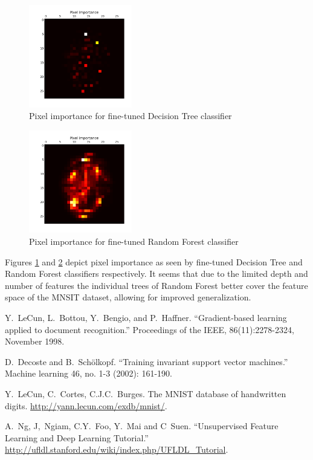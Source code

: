 \documentclass[journal, a4paper]{IEEEtran}
\begin{document}
    \begin{figure}[!hbt]
      \includegraphics[width=0.4\textwidth]{tree_importance}
      \caption{Pixel importance for fine-tuned Decision Tree classifier}
      \label{fig:tree_importance}
    \end{figure}
    \begin{figure}[!hbt]
      \includegraphics[width=0.4\textwidth]{random_importance}
      \caption{Pixel importance for fine-tuned Random Forest classifier}
      \label{fig:random_importance}
    \end{figure}
    
    Figures \ref{fig:tree_importance} and \ref{fig:random_importance} depict pixel importance as seen by fine-tuned Decision Tree and Random Forest classifiers respectively. It seems that due to the limited depth and number of features the individual trees of Random Forest better cover the feature space of the MNSIT dataset, allowing for improved generalization.


\begin{thebibliography}{5}

	Y.~LeCun, L.~Bottou, Y.~Bengio, and P.~Haffner. ``Gradient-based learning applied to document recognition.'' Proceedings of the IEEE, 86(11):2278-2324, November 1998.
	
	D.~Decoste and B.~Schölkopf. ``Training invariant support vector machines.'' Machine learning 46, no. 1-3 (2002): 161-190.

	Y.~LeCun, C.~Cortes, C.J.C.~Burges. The MNIST database of handwritten digits.
	\url{http://yann.lecun.com/exdb/mnist/}.
	
	A.~Ng, J,~Ngiam, C.Y.~Foo, Y.~Mai and C~Suen. ``Unsupervised Feature Learning and Deep Learning Tutorial.''
	\url{http://ufldl.stanford.edu/wiki/index.php/UFLDL_Tutorial}.

\end{thebibliography}

\end{document}
